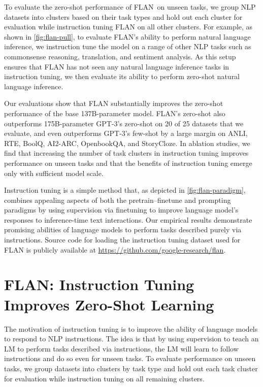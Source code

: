 To evaluate the zero-shot performance of FLAN\ on unseen tasks, we group NLP datasets into clusters based on their task types and hold out each cluster for evaluation while instruction tuning FLAN on all other clusters. For example, as shown in \ref{fig:flan-pull}, to evaluate FLAN's ability to perform natural language inference, we instruction tune the model on a range of other NLP tasks such as commonsense reasoning, translation, and sentiment analysis. As this setup ensures that FLAN has not seen any natural language inference tasks in instruction tuning, we then evaluate its ability to perform zero-shot natural language inference.

Our evaluations show that FLAN substantially improves the zero-shot performance of the base 137B-parameter model. FLAN's zero-shot also outperforms 175B-parameter GPT-3's zero-shot on 20 of 25 datasets that we evaluate, and even outperforms GPT-3's few-shot by a large margin on ANLI, RTE, BoolQ, AI2-ARC, OpenbookQA, and StoryCloze. In ablation studies, we find that increasing the number of task clusters in instruction tuning improves performance on unseen tasks and that the benefits of instruction tuning emerge only with sufficient model scale. 

Instruction tuning is a simple method that, as depicted in \ref{fig:flan-paradigm}, combines appealing aspects of both the pretrain--finetune and prompting paradigms by using supervision via finetuning to improve language model's responses to inference-time text interactions. Our empirical results demonstrate promising abilities of language models to perform tasks described purely via instructions. Source code for loading the instruction tuning dataset used for FLAN is publicly available at \url{https://github.com/google-research/flan}.

\section{FLAN: Instruction Tuning Improves Zero-Shot Learning} The motivation of instruction tuning is to improve the ability of language models to respond to NLP instructions. The idea is that by using supervision to teach an LM to perform tasks described via instructions, the LM will learn to follow instructions and do so even for unseen tasks. To evaluate performance on unseen tasks, we group datasets into clusters by task type and hold out each task cluster for evaluation while instruction tuning on all remaining clusters.

